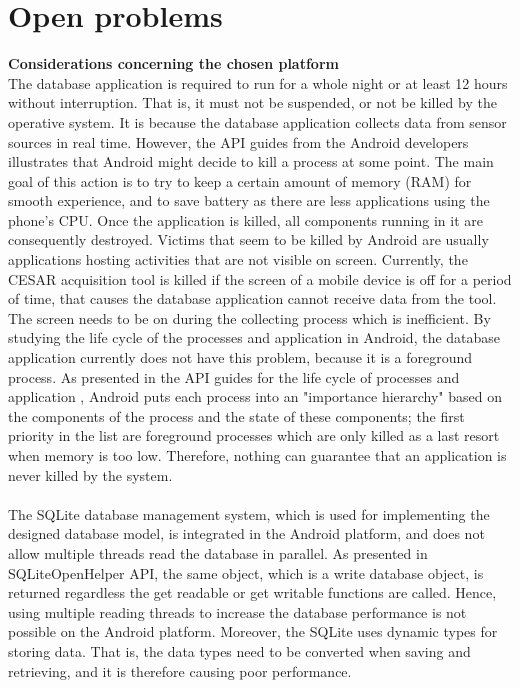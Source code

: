 \section{Open problems}
\textbf{Considerations concerning the chosen platform}\\
The database application is required to run for a whole night or at least 12 hours without interruption. That is, it must not be suspended, or not be killed by the operative system. It is because the database application collects data from sensor sources in real time. However, the API guides from the Android developers \citep{AndroidAPIProcess} illustrates that Android might decide to kill a process at some point. The main goal of this action is to try to keep a certain amount of memory (RAM) for smooth experience, and to save battery as there are less applications using the phone's CPU. Once the application is killed, all components running in it are consequently destroyed. Victims that seem to be killed by Android are usually applications hosting activities that are not visible on screen. Currently, the CESAR acquisition tool is killed if the screen of a mobile device is off for a period of time, that causes the database application cannot receive data from the tool. The screen needs to be on during the collecting process which is inefficient. By studying the life cycle of the processes and application in Android, the database application currently does not have this problem, because it is a foreground process. As presented in the API guides for the life cycle of processes and application \citep{AndroidAPIProcessLifeCycle}, Android puts each process into an "importance hierarchy" based on the components of the process and the state of these components; the first priority in the list are foreground processes which are only killed as a last resort when memory is too low. Therefore, nothing can guarantee that an application is never killed by the system.\\\\
The SQLite database management system, which is used for implementing the designed database model, is integrated in the Android platform, and does not allow multiple threads read the database in parallel. As presented in SQLiteOpenHelper API\citep{AndroidAPISQLiteOpen}, the same object, which is a write database object, is returned regardless the get readable or get writable functions are called. Hence, using multiple reading threads to increase the database performance is not possible on the Android platform. Moreover, the SQLite uses dynamic types for storing data. That is, the data types need to be converted when saving and retrieving, and it is therefore causing poor performance.\\\\
